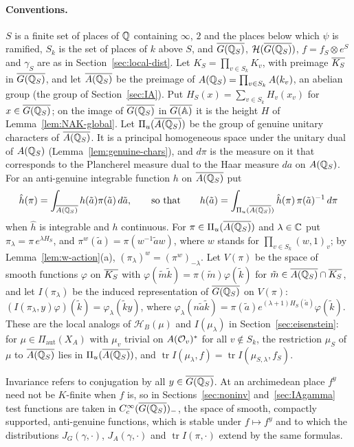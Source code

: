 \paragraph{Conventions.} $S$ is a finite set of places of $\mathbb{Q}$ containing
$\infty$, $2$ and the places below which $\psi$ is ramified, $S_k$ is the
set of places of $k$ above $S$, and $\overline{G(\mathbb{Q}_S)}$, $\mathcal H(\overline{G(\mathbb{Q}_S)})$,
$f=f_S\otimes e^S$ and $\gamma_S$ are as in Section~\ref{sec:local-dist}.
Let $K_S=\prod_{v\in S_k}K_v$, with preimage $\overline{K_S}$ in $\overline{G(\mathbb{Q}_S)}$, and let
$\overline{A(\mathbb{Q}_S)}$ be the preimage of $A(\mathbb{Q}_S)=\prod_{v\in S_k}A(k_v)$, an abelian
group (the group of Section~\ref{sec:IA}). Put
$H_S(x)=\sum_{v\in S_k}H_v(x_v)$ for $x\in\overline{G(\mathbb{Q}_S)}$; on the image of $\overline{G(\mathbb{Q}_S)}$ in
$\overline{G(\mathbb{A})}$ it is the height $H$ of Lemma~\ref{lem:NAK-global}. Let
$\Pi_u(\overline{A(\mathbb{Q}_S)})$ be the group of genuine unitary characters of $\overline{A(\mathbb{Q}_S)}$. It is
a principal homogeneous space under the unitary dual of $A(\mathbb{Q}_S)$
(Lemma~\ref{lem:genuine-chars}), and $d\pi$ is the measure on it that
corresponds to the Plancherel measure dual to the Haar measure $da$ on
$A(\mathbb{Q}_S)$. For an anti-genuine integrable function $h$ on $\overline{A(\mathbb{Q}_S)}$ put
\[
\hat h(\pi)=\int_{\overline{A(\mathbb{Q}_S)}}h(\tilde a)\pi(\tilde a)\,d\tilde a,\qquad\text{so
that}\qquad h(\tilde a)=\int_{\Pi_u(\overline{A(\mathbb{Q}_S)})}\hat h(\pi)\,\pi(\tilde a)^{-1}\,d\pi
\]
when $\hat h$ is integrable and $h$ continuous. For $\pi\in\Pi_u(\overline{A(\mathbb{Q}_S)})$ and
$\lambda\in\mathbb{C}$ put $\pi_\lambda=\pi\,e^{\lambda H_S}$, and
$\pi^w(\tilde a)=\pi(w^{-1}\tilde aw)$, where $w$ stands for
$\prod_{v\in S_k}(w,1)_v$; by Lemma~\ref{lem:w-action}(a),
$(\pi_\lambda)^w=(\pi^w)_{-\lambda}$. Let $V(\pi)$ be the space of smooth
functions $\varphi$ on $\overline{K_S}$ with $\varphi(\tilde m\tilde k)=\pi(\tilde
m)\varphi(\tilde k)$ for $\tilde m\in\overline{A(\mathbb{Q}_S)}\cap\overline{K_S}$, and let $I(\pi_\lambda)$
be the induced representation of $\overline{G(\mathbb{Q}_S)}$ on $V(\pi)$:
$(I(\pi_\lambda,y)\varphi)(\tilde k)=\varphi_\lambda(\tilde ky)$, where
$\varphi_\lambda(n\tilde a\tilde k)=\pi(\tilde a)e^{(\lambda+1)H_S(\tilde
a)}\varphi(\tilde k)$. These are the local analogs of
$\mathcal H_B(\mu)$ and $I(\mu_\lambda)$ in
Section~\ref{sec:eisenstein}: for $\mu\in\Pi_{\mathrm{aut}}(X_A)$ with
$\mu_v$ trivial on $A(\mathcal{O}_v)^*$ for all $v\notin S_k$, the restriction
$\mu_S$ of $\mu$ to $\overline{A(\mathbb{Q}_S)}$ lies in $\Pi_u(\overline{A(\mathbb{Q}_S)})$, and
$\operatorname{tr}I(\mu_\lambda,f)=\operatorname{tr}I(\mu_{S,\lambda},f_S)$.

Invariance refers to conjugation by all $y\in\overline{G(\mathbb{Q}_S)}$. At an archimedean
place $f^y$ need not be $K$-finite when $f$ is, so in
Sections~\ref{sec:noninv} and~\ref{sec:IAgamma} test functions are taken
in $C_c^\infty(\overline{G(\mathbb{Q}_S)})_-$, the space of smooth, compactly supported,
anti-genuine functions, which is stable under $f\mapsto f^y$ and to which
the distributions $J_G(\gamma,\cdot)$, $J_A(\gamma,\cdot)$ and
$\operatorname{tr}I(\pi,\cdot)$ extend by the same formulas.

